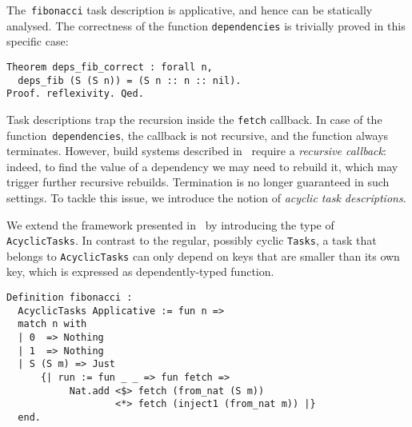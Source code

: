 \documentclass[sigplan,review]{acmart}\settopmatter{printfolios=true,printccs=false,printacmref=false}
\newcommand{\hs}{\texttt}
\begin{document}
The~\hs{fibonacci} task description is applicative, and hence can be statically
analysed. The correctness of the function \hs{dependencies} is trivially proved
in this specific case:

\vspace{-1mm}
\begin{verbatim}
Theorem deps_fib_correct : forall n,
  deps_fib (S (S n)) = (S n :: n :: nil).
Proof. reflexivity. Qed.
\end{verbatim}
\vspace{-1mm}

Task descriptions trap the recursion inside the \hs{fetch} callback. In case of
the function~\hs{dependencies}, the callback is not recursive, and the function
always terminates. However, build systems described in~\cite{Mokhov2018icfp}
require a \emph{recursive callback}: indeed, to find the value of a dependency we
may need to rebuild it, which may trigger further recursive rebuilds.
Termination is no longer guaranteed in such settings. To tackle this issue, we
introduce the notion of \emph{acyclic task descriptions}.



We extend the framework presented in~\cite{Mokhov2018icfp} by introducing the
type of \hs{AcyclicTasks}. In contrast to the regular, possibly cyclic
\hs{Tasks}, a task that belongs to \hs{AcyclicTasks} can only depend on keys
that are smaller than its own key, which is expressed as dependently-typed
function.


\vspace{-1mm}
\begin{verbatim}
Definition fibonacci :
  AcyclicTasks Applicative := fun n =>
  match n with
  | 0  => Nothing
  | 1  => Nothing
  | S (S m) => Just
      {| run := fun _ _ => fun fetch =>
           Nat.add <$> fetch (from_nat (S m))
                   <*> fetch (inject1 (from_nat m)) |}
  end.
\end{verbatim}
\vspace{-1mm}
\end{document}
